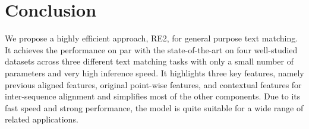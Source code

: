 \documentclass[11pt,a4paper]{article}
\begin{document}
\section{Conclusion}

We propose a highly efficient approach, RE2, for general purpose text matching. It achieves the performance on par with the state-of-the-art on four well-studied datasets across three different text matching tasks with only a small number of parameters and very high inference speed. It highlights three key features, namely previous aligned features, original point-wise features, and contextual features for inter-sequence alignment and simplifies most of the other components. Due to its fast speed and strong performance, the model is quite suitable for a wide range of related applications.



\end{document}
